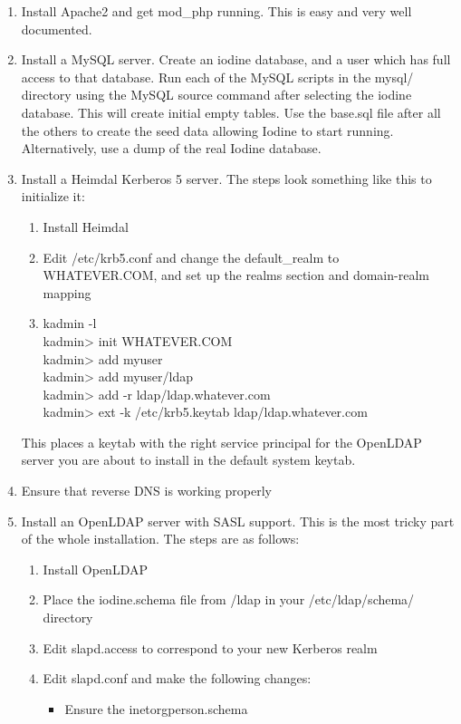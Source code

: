 \documentclass[11pt,letterpaper]{report}
\begin{document}
\begin{enumerate}
	\item Install Apache2 and get mod\_php running.  This is easy and
		very well documented.
	\item Install a MySQL server.  Create an iodine database, and a
		user which has full access to that database.  Run each of the
		MySQL scripts in the mysql/ directory using the MySQL source
		command after selecting the iodine database.  This will
		create initial empty tables.  Use the base.sql file after all
		the others to create the seed data allowing Iodine to start
		running.  Alternatively, use a dump of the real Iodine
		database.
	\item Install a Heimdal Kerberos 5 server.  The steps look
		something like this to initialize it:
		\begin{enumerate}
			\item Install Heimdal
			\item Edit /etc/krb5.conf and change the default\_realm
				to WHATEVER.COM, and set up the realms section
				and domain-realm mapping
			\item kadmin -l \\
				kadmin> init WHATEVER.COM \\
				kadmin> add myuser \\
				kadmin> add myuser/ldap \\
				kadmin> add -r ldap/ldap.whatever.com \\
				kadmin> ext -k /etc/krb5.keytab ldap/ldap.whatever.com
		\end{enumerate}
		This places a keytab with the right service principal for the
		OpenLDAP server you are about to install in the default system keytab.
	\item Ensure that reverse DNS is working properly
	\item Install an OpenLDAP server with SASL support.
		This is the most tricky part of the whole installation.
		The steps are as follows:
		\begin{enumerate}
			\item Install OpenLDAP
			\item Place the iodine.schema file from /ldap in your
				/etc/ldap/schema/ directory
			\item Edit slapd.access to correspond to your new
				Kerberos realm
			\item Edit slapd.conf and make the following changes:
				\begin{itemize}
					\item Ensure the inetorgperson.schema

\end{itemize}
\end{enumerate}
\end{enumerate}
\end{document}
